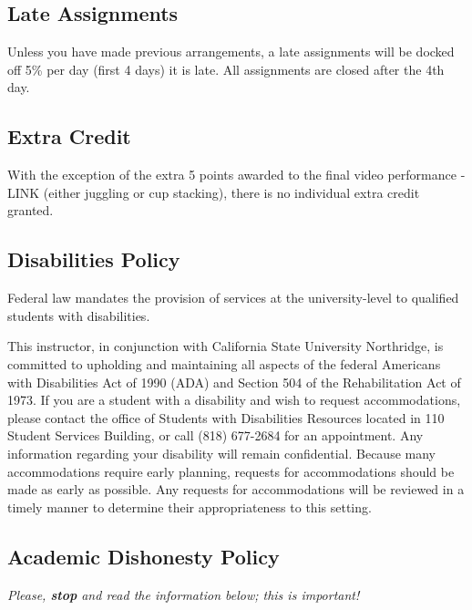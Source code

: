 \documentclass[
  letterpaper,
  DIV=11,
  numbers=noendperiod,
  oneside]{scrartcl}
\begin{document}
\hypertarget{late-assignments}{%
\subsection{Late Assignments}\label{late-assignments}}

Unless you have made previous arrangements, a late assignments will be
docked off 5\% per day (first 4 days) it is late. All assignments are
closed after the 4th day.

\hypertarget{extra-credit}{%
\subsection{Extra Credit}\label{extra-credit}}

With the exception of the extra 5 points awarded to the final video
performance - LINK (either juggling or cup stacking), there is no
individual extra credit granted.

\hypertarget{sec-disabilities-policy}{%
\subsection{Disabilities Policy}\label{sec-disabilities-policy}}

Federal law mandates the provision of services at the university-level
to qualified students with disabilities.

This instructor, in conjunction with California State University
Northridge, is committed to upholding and maintaining all aspects of the
federal Americans with Disabilities Act of 1990 (ADA) and Section 504 of
the Rehabilitation Act of 1973. If you are a student with a disability
and wish to request accommodations, please contact the office of
Students with Disabilities Resources located in 110 Student Services
Building, or call (818) 677-2684 for an appointment. Any information
regarding your disability will remain confidential. Because many
accommodations require early planning, requests for accommodations
should be made as early as possible. Any requests for accommodations
will be reviewed in a timely manner to determine their appropriateness
to this setting.

\hypertarget{academic-dishonesty-policy}{%
\subsection{Academic Dishonesty
Policy}\label{academic-dishonesty-policy}}

\emph{Please, \textbf{stop} and read the information below; this is
important!}
\end{document}
